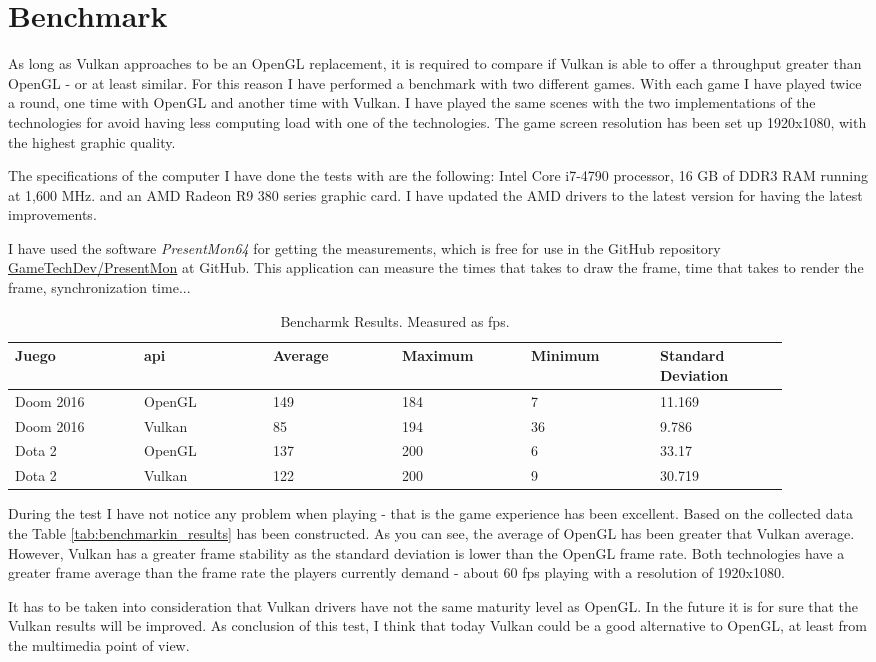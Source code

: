\chapter{Benchmark}
As long as Vulkan approaches to be an OpenGL replacement, it is required to compare if Vulkan is able to offer
a throughput greater than OpenGL - or at least similar. For this reason I have performed a benchmark with two different
games. With each game I have played twice a round, one time with OpenGL and another time with Vulkan. I have played the
same scenes with the two implementations of the technologies for avoid having less computing load with one of the
technologies. The game screen resolution has been set up 1920x1080, with the highest graphic quality.

The specifications of the computer I have done the tests with are the following: Intel Core i7-4790 processor, 16 GB
of DDR3 RAM running at 1,600 MHz. and an AMD Radeon R9 380 series graphic card. I have updated the AMD drivers to the
latest version for having the latest improvements.

I have used the software \emph{PresentMon64} for getting the measurements, which is free for use in the GitHub
repository \href{https://github.com/GameTechDev/PresentMon}{GameTechDev/PresentMon} at GitHub. This application can
measure the times that takes to draw the frame, time that takes to render the frame, synchronization time...

\begin{table*}[t]
  \centering
  \begin{tabular}{p{0.15\linewidth}p{0.15\linewidth}p{0.15\linewidth}p{0.15\linewidth}p{0.15\linewidth}p{0.15\linewidth}}
    \toprule
    Juego & \gls{api}    & Average & Maximum & Minimum & Standard Deviation \\
    \midrule
    Doom 2016   & OpenGL  & 149 & 184 & 7   & 11.169 \\
    Doom 2016   & Vulkan  & 85  & 194 & 36  & 9.786 \\
    Dota 2      & OpenGL  & 137 & 200 & 6   & 33.17 \\
    Dota 2      & Vulkan  & 122 & 200 & 9   & 30.719 \\
    \bottomrule
  \end{tabular}
  \caption{Bencharmk Results. Measured as \gls{fps}.}
  \label{tab:benchmarking_results}
\end{table*}

During the test I have not notice any problem when playing - that is the game experience has been excellent. Based
on the collected data the Table \ref{tab:benchmarkin_results} has been constructed. As you can see, the average of
OpenGL has been greater that Vulkan average. However, Vulkan has a greater frame stability as the standard deviation
is lower than the OpenGL frame rate. Both technologies have a greater frame average than the frame rate the players
currently demand - about 60 \gls{fps} playing with a resolution of 1920x1080.

It has to be taken into consideration that Vulkan drivers have not the same maturity level as OpenGL. In the future
it is for sure that the Vulkan results will be improved. As conclusion of this test, I think that today Vulkan could
be a good alternative to OpenGL, at least from the multimedia point of view.
